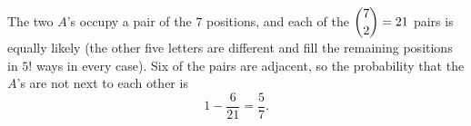 The two $A$'s occupy a pair of the $7$ positions, and each of the $\dbinom72=21$ pairs is equally likely (the other five letters are different and fill the remaining positions in $5!$ ways in every case). Six of the pairs are adjacent, so the probability that the $A$'s are not next to each other is
\[1-\dfrac{6}{21}=\boxed{\dfrac{5}{7}}.\]
